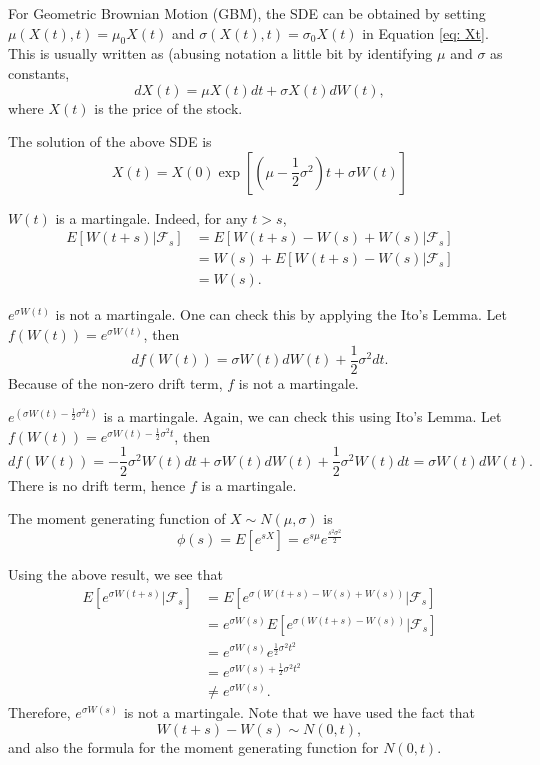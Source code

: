 \documentclass{amsart}
\theoremstyle{plain}
\numberwithin{equation}{section}
\begin{document}
For Geometric Brownian Motion (GBM), the
SDE can be obtained by setting
$\mu(X(t), t) = \mu_0X(t)$ and 
$\sigma( X(t), t) = \sigma_0X(t)$ in 
Equation \eqref{eq: Xt}. This is usually
written as (abusing notation a little bit by identifying 
$\mu$ and $\sigma$ as constants, 
\begin{equation}
dX(t) = \mu X(t)dt + \sigma X(t)dW(t),
\end{equation}
where $X(t)$ is the price of the stock.

The solution of the above SDE is
\begin{equation}
X(t) = X(0)\exp\left[ (\mu - \frac{1}{2} \sigma^2) t + \sigma W(t)\right]
\end{equation}


$W(t)$ is a martingale. Indeed, for any $t > s$,
\begin{align*}
E[ W(t+s) | \mathcal{F}_s ] &= 
E[ W(t+s) - W(s) +  W(s) | \mathcal{F}_s ]   \\
&= W(s) + E[ W(t+s) - W(s) | \mathcal{F}_s ] \\
&= W(s).
\end{align*}

$e^{\sigma W(t)}$ is not a martingale. One can check this by applying the 
Ito's Lemma. Let $f(W(t)) = e^{\sigma W(t)}$, then
\begin{equation}
df(W(t)) = \sigma W(t)dW(t) + \frac{1}{2}\sigma^2 dt.
\end{equation}
Because of the non-zero drift term, $f$ is not a martingale.

$e^{\left(\sigma W(t) - \frac{1}{2}\sigma^2 t\right)}$ is a martingale.
Again, we can check this using Ito's Lemma. 
Let $f(W(t)) = e^{\sigma W(t)-\frac{1}{2}\sigma^2 t}$, then
\begin{equation}
df(W(t)) = -\frac{1}{2}\sigma^2 W(t) dt + \sigma W(t)dW(t) + \frac{1}{2}\sigma^2 W(t)dt
= \sigma W(t)dW(t).
\end{equation}
There is no drift term, hence $f$ is a martingale.

The moment generating function of $X \sim N(\mu, \sigma)$ is 
\begin{equation}
\phi(s) = E[ e^{sX} ] = e^{s\mu}e^{\frac{s^2\sigma^2}{2}}
\end{equation}

Using the above result, we see that
\begin{align*}
E[e^{\sigma W(t+s)} | \mathcal{F}_s] 
&= E[e^{\sigma (W(t+s) - W(s) + W(s))} | \mathcal{F}_s]\\
&= e^{\sigma W(s)}E[e^{\sigma (W(t+s) - W(s))}| \mathcal{F}_s]\\
&= e^{\sigma W(s)}e^{\frac{1}{2}\sigma^2 t^2}\\
&= e^{\sigma W(s) + \frac{1}{2}\sigma^2 t^2}\\
&\neq e^{\sigma W(s)}.
\end{align*}
Therefore, $e^{\sigma W(s)}$ is not a martingale. Note that 
we have used the fact that 
\begin{equation}
W(t+s) - W(s) \sim N(0, t), 
\end{equation}
and also the formula for the moment generating 
function for $N(0, t)$.
\end{document}
